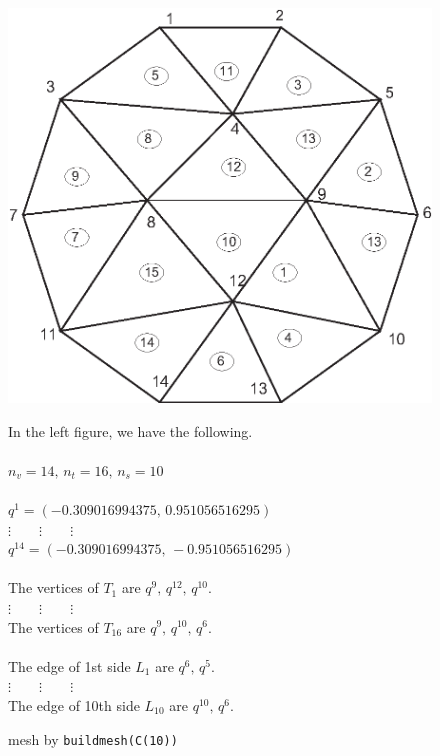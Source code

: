 \documentclass[a4paper,twoside,12pt]{book}
\begin{document}
\begin{figure}[htbp]
\begin{minipage}{\textwidth}
\begin{minipage}{0.5\textwidth}
\includegraphics[width=\textwidth]{mesh_sample}%
\caption{mesh by \texttt{buildmesh(C(10))}
\label{fig:meshSample}}
\end{minipage}
\hspace{0.5mm}
\begin{minipage}{0.5\textwidth}
In the left figure, we have the following.\\\\
$n_v=14,\, n_t=16,\, n_s=10$\\\\
$q^1=(-0.309016994375,\, 0.951056516295)$\\
$\vdots\qquad \vdots\qquad \vdots$\\
$q^{14}=(-0.309016994375,\, -0.951056516295)$\\\\
The vertices of $T_1$ are $q^9,\, q^{12},\, q^{10}$.\\
$\vdots\qquad \vdots\qquad \vdots$\\
The vertices of $T_{16}$ are $q^9,\, q^{10},\, q^{6}$.\\\\
The edge of 1st side $L_1$ are $q^6,\, q^5$.\\
$\vdots\qquad \vdots\qquad \vdots$\\
The edge of 10th side $L_{10}$ are $q^{10},\, q^6$.\\
\end{minipage}
\end{minipage}
\end{figure}
\end{document}
